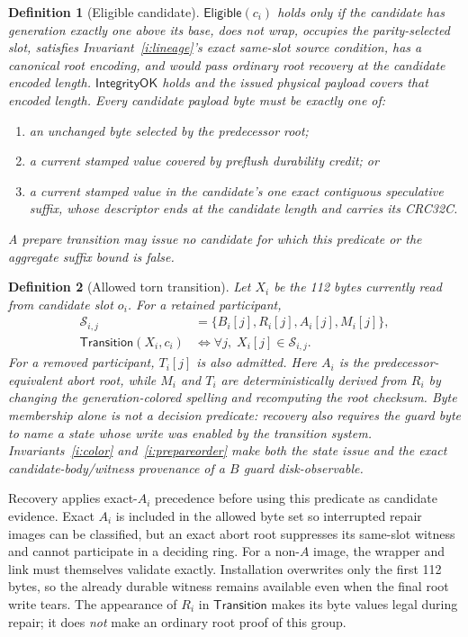 \documentclass[10pt,twocolumn]{article}
\newtheorem{definition}{Definition}
\theoremstyle{remark}
\begin{document}
\begin{definition}[Eligible candidate]\label{def:eligible}
$\mathsf{Eligible}(c_i)$ holds only if the candidate has generation exactly one above its base,
does not wrap, occupies the parity-selected slot, satisfies Invariant~\ref{i:lineage}'s exact
same-slot source condition, has a canonical root encoding, and would pass ordinary root recovery at
the candidate encoded length. $\mathsf{IntegrityOK}$ holds and the issued physical
payload covers that encoded length. Every candidate payload byte must be exactly one of:
\begin{enumerate}
  \item an unchanged byte selected by the predecessor root;
  \item a current stamped value covered by preflush durability credit; or
  \item a current stamped value in the candidate's one exact contiguous speculative suffix, whose
  descriptor ends at the candidate length and carries its CRC32C.
\end{enumerate}
A prepare transition may issue no candidate for which this predicate or the aggregate suffix bound
is false.
\end{definition}

\begin{definition}[Allowed torn transition]
Let $X_i$ be the 112 bytes currently read from candidate slot $o_i$. For a retained participant,
\[
  \begin{aligned}
    \mathcal{S}_{i,j} &= \{B_i[j],R_i[j],A_i[j],M_i[j]\}, \\
    \mathsf{Transition}(X_i,c_i) &\iff \forall j,\;X_i[j]\in\mathcal{S}_{i,j}.
  \end{aligned}
\]
For a removed participant, $T_i[j]$ is also admitted. Here $A_i$ is the predecessor-equivalent
abort root, while $M_i$ and $T_i$ are deterministically derived from $R_i$ by changing the
generation-colored spelling and recomputing the root checksum. Byte membership alone is not a
decision predicate: recovery also requires the guard byte to name a state whose write was enabled
by the transition system. Invariants~\ref{i:color} and~\ref{i:prepareorder} make both the state
issue and the exact candidate-body/witness provenance of a $B$ guard disk-observable.
\end{definition}

Recovery applies exact-$A_i$ precedence before using this predicate as candidate evidence. Exact
$A_i$ is included in the allowed byte set so interrupted repair images can be classified, but an
exact abort root suppresses its same-slot witness and cannot participate in a deciding ring. For a
non-$A$ image, the wrapper and link must themselves validate exactly. Installation overwrites only
the first 112 bytes, so the already durable witness remains available even when the final root write tears.
The appearance of $R_i$ in $\mathsf{Transition}$ makes its byte values legal during repair; it does
\emph{not} make an ordinary root proof of this group.
\end{document}
